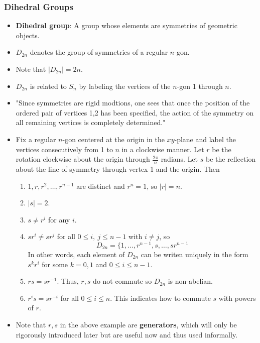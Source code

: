 \documentclass[../main.tex]{subfiles}
\begin{document}
\subsubsection{Dihedral Groups}
\begin{itemize}
    \item \textbf{Dihedral group}: A group whose elements are symmetries of geometric objects.
    \item $D_{2n}$ denotes the group of symmetries of a regular $n$-gon.
    \item Note that $|D_{2n}|=2n$.
    \item $D_{2n}$ is related to $S_n$ by labeling the vertices of the $n$-gon 1 through $n$.
    \item "Since symmetries are rigid modtions, one sees that once the position of the ordered pair of vertices 1,2 has been specified, the action of the symmetry on all remaining vertices is completely determined."
    \item Fix a regular $n$-gon centered at the origin in the $xy$-plane and label the vertices consecutively from 1 to $n$ in a clockwise manner. Let $r$ be the rotation clockwise about the origin through $\frac{2\pi}{n}$ radians. Let $s$ be the reflection about the line of symmetry through vertex 1 and the origin. Then
    \begin{enumerate}[label={\textbf{(\arabic*)}}]
        \item $1,r,r^2,\dots,r^{n-1}$ are distinct and $r^n=1$, so $|r|=n$.
        \item $|s|=2$.
        \item $s\neq r^i$ for any $i$.
        \item $sr^i\neq sr^j$ for all $0\leq i,\ j\leq n-1$ with $i\neq j$, so
        \begin{equation*}
            D_{2n} = \{1,\dots,r^{n-1},s,\dots,sr^{n-1}
        \end{equation*}
        In other words, each element of $D_{2n}$ can be writen uniquely in the form $s^kr^i$ for some $k=0,1$ and $0\leq i\leq n-1$.
        \item $rs=sr^{-1}$. Thus, $r,s$ do not commute so $D_{2n}$ is non-abelian.
        \item $r^is=sr^{-i}$ for all $0\leq i\leq n$. This indicates how to commute $s$ with powers of $r$.
    \end{enumerate}
    \item Note that $r,s$ in the above example are \textbf{generators}, which will only be rigorously introduced later but are useful now and thus used informally.

\end{itemize}
\end{document}
